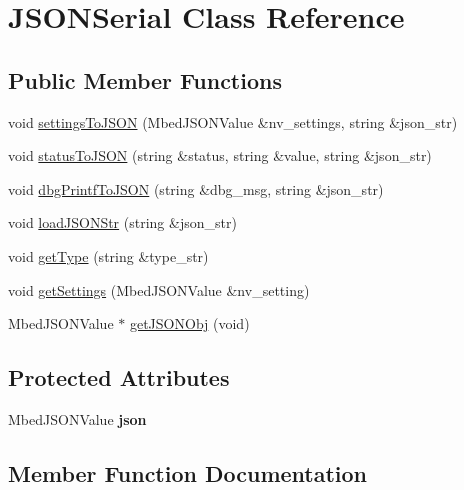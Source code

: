\hypertarget{classJSONSerial}{}\section{J\+S\+O\+N\+Serial Class Reference}
\label{classJSONSerial}
\subsection*{Public Member Functions}
\begin{DoxyCompactItemize}
\item 
void \hyperlink{classJSONSerial_a32f2b8eddfbe137c61b77352445e1e09}{settings\+To\+J\+S\+ON} (Mbed\+J\+S\+O\+N\+Value \&nv\+\_\+settings, string \&json\+\_\+str)
\item 
void \hyperlink{classJSONSerial_ae1fb99c885d204203a48ef45c16252a2}{status\+To\+J\+S\+ON} (string \&status, string \&value, string \&json\+\_\+str)
\item 
void \hyperlink{classJSONSerial_a6070c03a5caca84d5bd4237db0bd28c4}{dbg\+Printf\+To\+J\+S\+ON} (string \&dbg\+\_\+msg, string \&json\+\_\+str)
\item 
void \hyperlink{classJSONSerial_a21379660c361f4d26f0fd42a4734662e}{load\+J\+S\+O\+N\+Str} (string \&json\+\_\+str)
\item 
void \hyperlink{classJSONSerial_ace1745d4308eef3f8734186cf55496e2}{get\+Type} (string \&type\+\_\+str)
\item 
void \hyperlink{classJSONSerial_a7f12c4a3d58ff26825fbaf8694b7a795}{get\+Settings} (Mbed\+J\+S\+O\+N\+Value \&nv\+\_\+setting)
\item 
Mbed\+J\+S\+O\+N\+Value $\ast$ \hyperlink{classJSONSerial_a80f901fa66a7d4e5ed91c01493e5adfe}{get\+J\+S\+O\+N\+Obj} (void)
\end{DoxyCompactItemize}
\subsection*{Protected Attributes}
\begin{DoxyCompactItemize}
\item 
\mbox{\label{classJSONSerial_a2331c7c7da1ee32488b9c73821703c8d}} 
Mbed\+J\+S\+O\+N\+Value {\bfseries json}
\end{DoxyCompactItemize}


\subsection{Member Function Documentation}
\mbox{\label{classJSONSerial_a6070c03a5caca84d5bd4237db0bd28c4}} 
